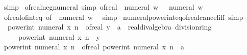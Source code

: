 \begin{isabellebody}
\ simp%
\endisatagproof
{\isafoldproof}%
%
\isadelimproof
\isanewline
%
\endisadelimproof
\isanewline
{}\isamarkupfalse%
\ of{\isacharunderscore}{\kern0pt}real{\isacharunderscore}{\kern0pt}neg{\isacharunderscore}{\kern0pt}numeral\ {\isacharbrackleft}{\kern0pt}simp{\isacharbrackright}{\kern0pt}{\isacharcolon}{\kern0pt}\ {\isachardoublequoteopen}of{\isacharunderscore}{\kern0pt}real\ {\isacharparenleft}{\kern0pt}{\isacharminus}{\kern0pt}\ numeral\ w{\isacharparenright}{\kern0pt}\ {\isacharequal}{\kern0pt}\ {\isacharminus}{\kern0pt}\ numeral\ w{\isachardoublequoteclose}\isanewline
%
\isadelimproof
\ \ %
\endisadelimproof
%
\isatagproof
{}\isamarkupfalse%
\ of{\isacharunderscore}{\kern0pt}real{\isacharunderscore}{\kern0pt}of{\isacharunderscore}{\kern0pt}int{\isacharunderscore}{\kern0pt}eq\ {\isacharbrackleft}{\kern0pt}of\ {\isachardoublequoteopen}{\isacharminus}{\kern0pt}\ numeral\ w{\isachardoublequoteclose}{\isacharbrackright}{\kern0pt}\ \isamarkupfalse%
\ simp%
\endisatagproof
{\isafoldproof}%
%
\isadelimproof
\isanewline
%
\endisadelimproof
\isanewline
{}\isamarkupfalse%
\ numeral{\isacharunderscore}{\kern0pt}power{\isacharunderscore}{\kern0pt}int{\isacharunderscore}{\kern0pt}eq{\isacharunderscore}{\kern0pt}of{\isacharunderscore}{\kern0pt}real{\isacharunderscore}{\kern0pt}cancel{\isacharunderscore}{\kern0pt}iff\ {\isacharbrackleft}{\kern0pt}simp{\isacharbrackright}{\kern0pt}{\isacharcolon}{\kern0pt}\isanewline
\ \ {\isachardoublequoteopen}power{\isacharunderscore}{\kern0pt}int\ {\isacharparenleft}{\kern0pt}numeral\ x{\isacharparenright}{\kern0pt}\ n\ {\isacharequal}{\kern0pt}\ {\isacharparenleft}{\kern0pt}of{\isacharunderscore}{\kern0pt}real\ y\ {\isacharcolon}{\kern0pt}{\isacharcolon}{\kern0pt}\ {\isacharprime}{\kern0pt}a\ {\isacharcolon}{\kern0pt}{\isacharcolon}{\kern0pt}\ {\isacharbraceleft}{\kern0pt}real{\isacharunderscore}{\kern0pt}div{\isacharunderscore}{\kern0pt}algebra{\isacharcomma}{\kern0pt}\ division{\isacharunderscore}{\kern0pt}ring{\isacharbraceright}{\kern0pt}{\isacharparenright}{\kern0pt}\ {\isasymlongleftrightarrow}\isanewline
\ \ \ \ \ power{\isacharunderscore}{\kern0pt}int\ {\isacharparenleft}{\kern0pt}numeral\ x{\isacharparenright}{\kern0pt}\ n\ {\isacharequal}{\kern0pt}\ y{\isachardoublequoteclose}\isanewline
%
\isadelimproof
%
\endisadelimproof
%
\isatagproof
{}\isamarkupfalse%
\ {\isacharminus}{\kern0pt}\isanewline
\ \ \isamarkupfalse%
\ {\isachardoublequoteopen}power{\isacharunderscore}{\kern0pt}int\ {\isacharparenleft}{\kern0pt}numeral\ x{\isacharparenright}{\kern0pt}\ n\ {\isacharequal}{\kern0pt}\ {\isacharparenleft}{\kern0pt}of{\isacharunderscore}{\kern0pt}real\ {\isacharparenleft}{\kern0pt}power{\isacharunderscore}{\kern0pt}int\ {\isacharparenleft}{\kern0pt}numeral\ x{\isacharparenright}{\kern0pt}\ n{\isacharparenright}{\kern0pt}\ {\isacharcolon}{\kern0pt}{\isacharcolon}{\kern0pt}\ {\isacharprime}{\kern0pt}a{\isacharparenright}{\kern0pt}{\isachardoublequoteclose}\isanewline

\end{isabellebody}
